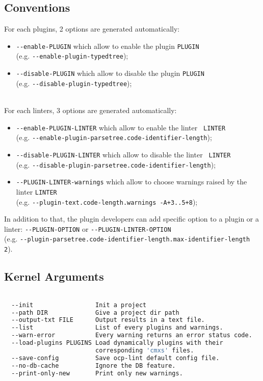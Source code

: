 \subsection{Conventions}
For each plugins, 2 options are generated automatically:
\begin{itemize}
\item {\tt \--\--enable-PLUGIN} which allow to enable the plugin {\tt PLUGIN} \\
  (e.g. {\tt \--\--enable-plugin-typedtree});
\item {\tt \--\--disable-PLUGIN} which allow to disable the plugin {\tt PLUGIN} \\
  (e.g. {\tt \--\--disable-plugin-typedtree});
\end{itemize}
~\\
For each linters, 3 options are generated automatically:
\begin{itemize}
\item {\tt \--\--enable-PLUGIN-LINTER} which allow to enable the linter {\tt
    LINTER} \\
  (e.g. {\tt \--\--enable-plugin-parsetree.code-identifier-length});
\item {\tt \--\--disable-PLUGIN-LINTER} which allow to disable the linter {\tt
    LINTER} \\
 (e.g. {\tt \--\--disable-plugin-parsetree.code-identifier-length});
\item {\tt \--\--PLUGIN-LINTER-warnings} which allow to choose warnings raised
  by the linter {\tt LINTER} \\
  (e.g. {\tt \--\--plugin-text.code-length.warnings -A+3..5+8});
\end{itemize}

In addition to that, the plugin developers can add specific option to a plugin
or a linter: {\tt \--\--PLUGIN-OPTION} or {\tt \--\--PLUGIN-LINTER-OPTION} \\ 
(e.g. {\tt \--\--plugin-parsetree.code-identifier-length.max-identifier-length 2}).

\subsection{Kernel Arguments}
\begin{lstlisting}[language=bash,basicstyle=\tt\small,showspaces=falseshowstringspaces=false]

  --init                 Init a project
  --path DIR             Give a project dir path
  --output-txt FILE      Output results in a text file.
  --list                 List of every plugins and warnings.
  --warn-error           Every warning returns an error status code.
  --load-plugins PLUGINS Load dynamically plugins with their 
                         corresponding 'cmxs' files.
  --save-config          Save ocp-lint default config file.
  --no-db-cache          Ignore the DB feature.
  --print-only-new       Print only new warnings.
\end{lstlisting}


